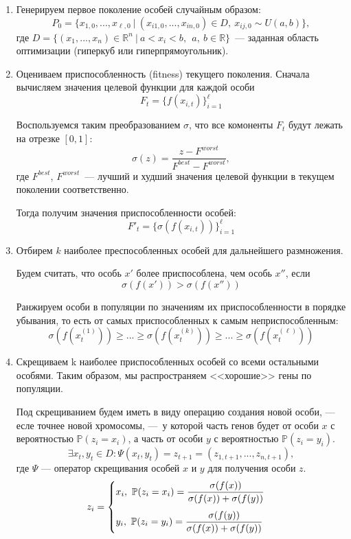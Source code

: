 \begin{enumerate}
	\item Генерируем первое поколение особей случайным образом:
	\[
		P_0 = \{x_{1, 0}, ..., x_{\ell, 0} \ | \ (x_{i1, 0}, ..., x_{in, 0}) \in D, \  x_{ij, 0} \sim U(a, b)\},
	\]
	где $D = \{(x_1, ..., x_n) \in \mathbb{R}^n \ | \  a < x_i < b,\ \ a,\ b \in \mathbb{R} \} $~--- заданная область оптимизации (гиперкуб или гиперпрямоугольник).

	\item Оцениваем приспособленность (fitness) текущего поколения.
	Сначала вычисляем значения целевой функции  для каждой особи
	\[
		F_t = \{f(x_{i,t})\}_{i=1}^\ell
	\]

	Воспользуемся таким преобразованием $\sigma$, что все комоненты $F_t$ будут лежать на отрезке $[0, 1]$:
	\[
		\sigma(z) = \dfrac{z - F^{worst}}{F^{best} - F^{worst}},
	\]
	где $F^{best}$, $F^{worst}$~--- лучший и худший значения целевой функции в текущем поколении соответственно.


	Тогда получим значения приспособленности особей:
	\[
	F'_t = \{\sigma(f(x_{i, t}))\}_{i=1}^\ell
	\]

	\item  Отбирем $k$ наиболее преспособленных особей для дальнейшего размножения.

	Будем считать, что особь $x'$ более приспособлена, чем особь $x''$, если
	\[
		\sigma(f(x')) > \sigma(f(x''))
	\]

	Ранжируем особи в популяции по значениям их приспособленности в порядке убывания, то есть от самых приспособленных к самым неприспособленным:
	\[
		\sigma(f(x^{(1)}_t)) \geq ... \geq \sigma(f(x^{(k)}_t)) \geq ... \geq \sigma(f(x^{(\ell)}_t))
	\]

	\item Скрещиваем k наиболее приспособленных особей со всеми остальными особями. Таким образом, мы распространяем <<хорошие>> гены по популяции.

	Под скрещиванием будем иметь в виду операцию создания новой особи, — есле точнее новой хромосомы, — у которой часть генов будет от особи $x$ с вероятностью $\mathbb{P}(z_i = x_i)$, а часть от особи $y$ с вероятностью $\mathbb{P}(z_i = y_i)$.
	\[
		\exists x_t, y_t \in D \colon \Psi(x_t,y_t) = z_{t + 1} = (z_{1,t + 1}, ..., z_{n, t + 1}),
	\]
	где $\Psi$ --- оператор скрещивания особей $x$ и $y$ для получения особи $z$.
\[
z_i
=
\begin{cases}
	x_i, \ \mathbb{P}(z_i = x_i) = \dfrac{\sigma(f(x))}{\sigma(f(x)) + \sigma(f(y))} \\
	\vspace{-7pt} \\
	y_i, \ \mathbb{P}(z_i = y_i) = \dfrac{\sigma(f(y))}{\sigma(f(x)) + \sigma(f(y))}
\end{cases}
\]


\end{enumerate}
